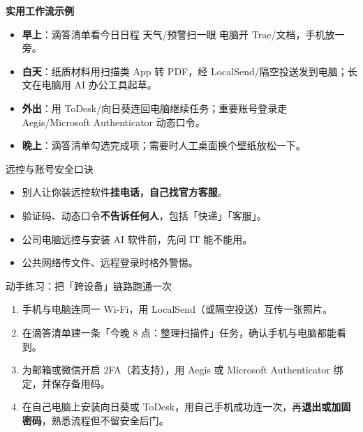 \textbf{实用工作流示例}\par

\begin{itemize}
  \item \textbf{早上}：滴答清单看今日日程 天气/预警扫一眼 电脑开 Trae/文档，手机放一旁。
  \item \textbf{白天}：纸质材料用扫描类 App 转 PDF，经 LocalSend/隔空投送发到电脑；长文在电脑用 AI 办公工具起草。
  \item \textbf{外出}：用 ToDesk/向日葵连回电脑继续任务；重要账号登录走 Aegis/Microsoft Authenticator 动态口令。
  \item \textbf{晚上}：滴答清单勾选完成项；需要时人工桌面换个壁纸放松一下。
\end{itemize}

\begin{tcbwarn}{远控与账号安全口诀}
\begin{itemize}
  \item 别人让你装远控软件\textbf{挂电话，自己找官方客服}。
  \item 验证码、动态口令\textbf{不告诉任何人}，包括「快递」「客服」。
  \item 公司电脑远控与安装 AI 软件前，先问 IT 能不能用。
  \item 公共网络传文件、远程登录时格外警惕。
\end{itemize}

\end{tcbwarn}

\begin{tcbpractice}{动手练习：把「跨设备」链路跑通一次}
\begin{enumerate}
  \item 手机与电脑连同一 Wi-Fi，用 LocalSend（或隔空投送）互传一张照片。
  \item 在滴答清单建一条「今晚 8 点：整理扫描件」任务，确认手机与电脑都能看到。
  \item 为邮箱或微信开启 2FA（若支持），用 Aegis 或 Microsoft Authenticator 绑定，并保存备用码。
  \item 在自己电脑上安装向日葵或 ToDesk，用自己手机成功连一次，再\textbf{退出或加固密码}，熟悉流程但不留安全后门。
\end{enumerate}

\end{tcbpractice}
